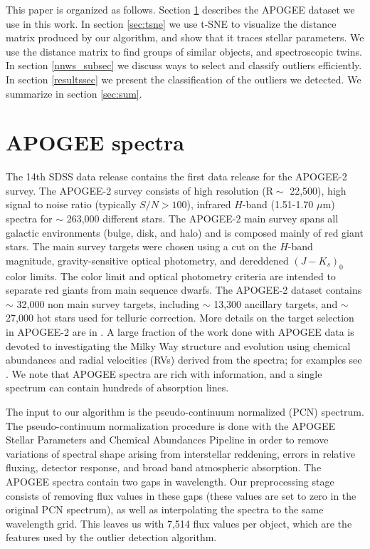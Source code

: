 \documentclass[fleqn,usenatbib]{mnras}
\begin{document}
This paper is organized as follows. Section \ref{sec:apogee_data} describes the APOGEE dataset we use in this work. In section \ref{sec:tsne} we use t-SNE to visualize the distance matrix produced by our algorithm, and show that it traces stellar parameters. We use the distance matrix to find groups of similar objects, and spectroscopic twins.  In section \ref{nnws_subsec} we discuss ways to select and classify outliers efficiently. In section \ref{resultssec} we present the classification of the outliers we detected. We summarize in section \ref{sec:sum}.



\section{APOGEE spectra}
\label{sec:apogee_data}
The 14th SDSS data release \citep[DR14;][]{abolfathi17} contains the first data release for the APOGEE-2 survey. The APOGEE-2 survey consists of high resolution ($\mathrm{R} \sim$ 22,500), high signal to noise ratio (typically $S/N > 100$), infrared $H$-band (1.51-1.70 $\mu$m) spectra for $\sim$ 263,000 different stars. The APOGEE-2 main survey spans all galactic environments (bulge, disk, and halo) and is composed mainly of red giant stars. The main survey targets were chosen using a cut on the $H$-band magnitude, gravity-sensitive optical photometry, and dereddened $\left( J - K_{s} \right)_0$ color limits. The color limit and optical photometry criteria are intended to separate red giants from main sequence dwarfs.  The APOGEE-2 dataset contains  $\sim$ 32,000 non main survey targets, including $\sim$ 13,300 ancillary targets, and $\sim$ 27,000 hot stars used for telluric correction. More details on the target selection in APOGEE-2 are in \citet{zasowski17}. A large fraction of the work done with APOGEE data is devoted to investigating the Milky Way structure and evolution using chemical abundances and radial velocities (RVs) derived from the spectra; for examples see \citet{frinchaboy13,nidever14,bovy14,ness15,chiappini15,hayden15}. We note that APOGEE spectra are rich with information, and a single spectrum can contain hundreds of absorption lines.

The input to our algorithm is the pseudo-continuum normalized (PCN) spectrum. The pseudo-continuum normalization procedure is done with the APOGEE Stellar Parameters and Chemical Abundances Pipeline \citep[ASPCAP;][]{garcia-perez16} in order to remove variations of spectral shape arising from interstellar reddening, errors in relative fluxing, detector response, and broad band atmospheric absorption. The APOGEE spectra contain two gaps in wavelength. Our preprocessing stage consists of removing flux values in these gaps (these values are set to zero in the original PCN spectrum), as well as interpolating the spectra to the same wavelength grid. This leaves us with 7,514 flux values per object, which are the features used by the outlier detection algorithm.
\end{document}
